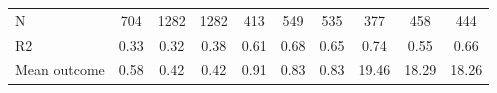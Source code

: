 \begin{tabular}{lccc|ccc|ccc}
N           &         704         &        1282         &        1282         &         413         &         549         &         535         &         377         &         458         &         444         \\
R2          &        0.33         &        0.32         &        0.38         &        0.61         &        0.68         &        0.65         &        0.74         &        0.55         &        0.66         \\
Mean outcome&        0.58         &        0.42         &        0.42         &        0.91         &        0.83         &        0.83         &       19.46         &       18.29         &       18.26         \\
\bottomrule \end{tabular}
